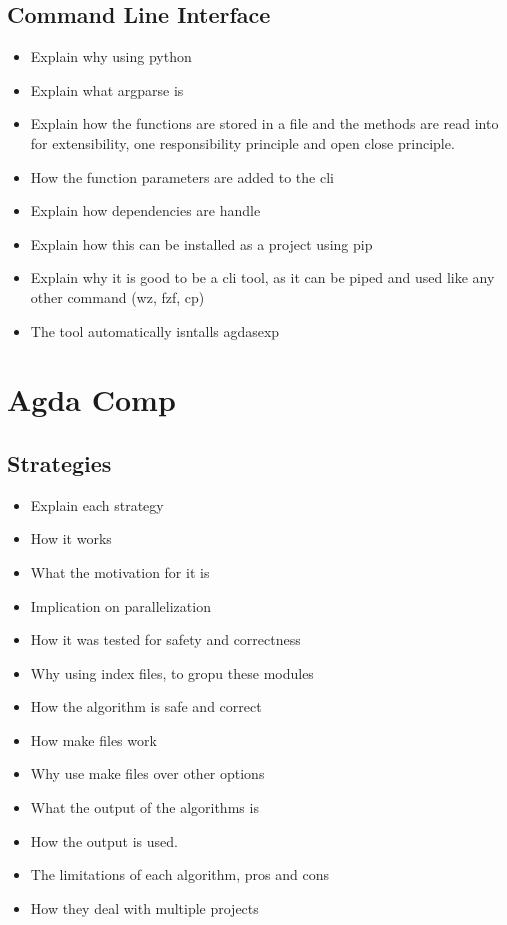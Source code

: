 \begin{itemize}
\subsection{Command Line Interface}

\begin{itemize}
\item Explain why using python
\item Explain what argparse is 
\item Explain how the functions are stored in a file and the methods are read into for extensibility, one responsibility principle and open close principle.
\item How the function parameters are added to the cli 
\item Explain how dependencies are handle 
\item Explain how this can be installed as a project using pip 
\item Explain why it is good to be a cli tool, as it can be piped and used like any other command (wz, fzf, cp) 
\item The tool automatically isntalls agdasexp
\end{itemize}

\section{Agda Comp}

\subsection{Strategies}

\begin{itemize}
\item Explain each strategy 
\item How it works 
\item What the motivation for it is 
\item Implication on parallelization 
\item How it was tested for safety and correctness 
\item Why using index files, to gropu these modules 
\item How the algorithm is safe and correct 
\item How make files work 
\item Why use make files over other options 
\item What the output of the algorithms is 
\item How the output is used. 
\item The limitations of each algorithm, pros and cons 
\item How they deal with multiple projects
\end{itemize}


\end{itemize}
